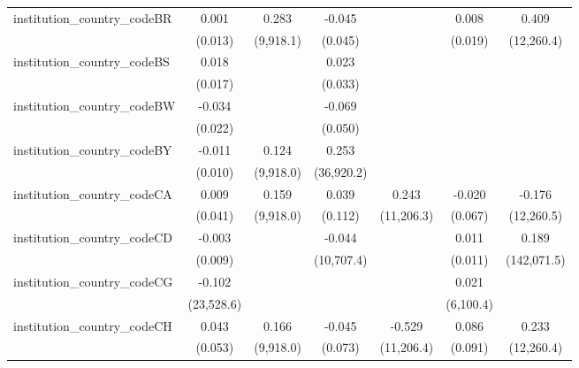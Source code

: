 \begin{tabular}{lcccccc}
   institution\_country\_codeBR          & 0.001          & 0.283         & -0.045        &              & 0.008        & 0.409\\   
                                         & (0.013)        & (9,918.1)     & (0.045)       &              & (0.019)      & (12,260.4)\\   
   institution\_country\_codeBS          & 0.018          &               & 0.023         &              &              &   \\   
                                         & (0.017)        &               & (0.033)       &              &              &   \\   
   institution\_country\_codeBW          & -0.034         &               & -0.069        &              &              &   \\   
                                         & (0.022)        &               & (0.050)       &              &              &   \\   
   institution\_country\_codeBY          & -0.011         & 0.124         & 0.253         &              &              &   \\   
                                         & (0.010)        & (9,918.0)     & (36,920.2)    &              &              &   \\   
   institution\_country\_codeCA          & 0.009          & 0.159         & 0.039         & 0.243        & -0.020       & -0.176\\   
                                         & (0.041)        & (9,918.0)     & (0.112)       & (11,206.3)   & (0.067)      & (12,260.5)\\   
   institution\_country\_codeCD          & -0.003         &               & -0.044        &              & 0.011        & 0.189\\   
                                         & (0.009)        &               & (10,707.4)    &              & (0.011)      & (142,071.5)\\   
   institution\_country\_codeCG          & -0.102         &               &               &              & 0.021        &   \\   
                                         & (23,528.6)     &               &               &              & (6,100.4)    &   \\   
   institution\_country\_codeCH          & 0.043          & 0.166         & -0.045        & -0.529       & 0.086        & 0.233\\   
                                         & (0.053)        & (9,918.0)     & (0.073)       & (11,206.4)   & (0.091)      & (12,260.4)\\   

\end{tabular}
